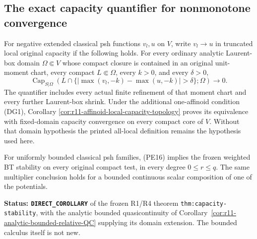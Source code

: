 \subsection{The exact capacity quantifier for nonmonotone convergence}

\begin{definition}
\label{def:r11-truncated-local-capacity}
For negative extended classical psh functions $v_l,u$ on $V$,
write $v_l\to u$ in truncated local original capacity if the
following holds. For every ordinary analytic Laurent-box domain
$\Omega\Subset V$ whose compact closure is contained in an
original unit-moment chart, every compact $L\Subset\Omega$,
every $k>0$, and every $\delta>0$,
\[
 \operatorname{Cap}_{S|\Omega}
 \left(L\cap\{|\max(v_l,-k)-\max(u,-k)|>\delta\};\Omega\right)
                                               \longrightarrow0.
 \tag{PE16}
\]
The quantifier includes every actual finite refinement of that
moment chart and every further Laurent-box shrink. Under the
additional one-affinoid condition (DG1), Corollary
\ref{cor:r11-affinoid-local-capacity-topology} proves its equivalence
with fixed-domain capacity convergence on every compact core of $V$.
Without that domain hypothesis the printed all-local definition
remains the hypothesis used here.
\end{definition}

\begin{lemma}
\label{lem:r11-bounded-analytic-capacity-stability}
For uniformly bounded classical psh families, (PE16) implies the
frozen weighted BT stability on every original compact test, in
every degree $0\leq r\leq q$. The same multiplier conclusion
holds for a bounded continuous scalar composition of one of
the potentials.
\end{lemma}

\noindent\textbf{Status: \texttt{DIRECT\_COROLLARY}} of the
frozen R1/R4 theorem \texttt{thm:capacity-stability}, with the
analytic bounded quasicontinuity of
Corollary~\ref{cor:r11-analytic-bounded-relative-QC} supplying
its domain extension. The bounded calculus itself is not new.

